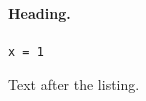 \documentclass{article}
\begin{document}
\paragraph{Heading.}

\begin{lstlisting}[frame=lines]
x = 1
\end{lstlisting}

Text after the listing.
\end{document}
